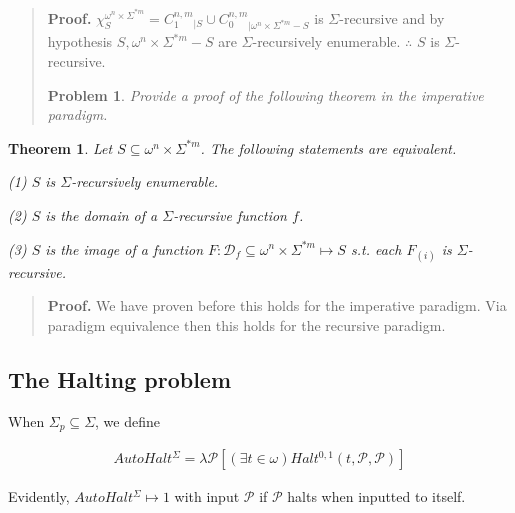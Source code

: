 \documentclass[a4paper, 12pt]{article}
\newtheorem{problem}{Problem}
\newtheorem{theorem}{Theorem}
\newtheorem{problem}{Problem}
\newtheorem{theorem}{Theorem}
\begin{document}
\small
\begin{quote}

    \textbf{Proof.} $\chi_{S}^{\omega^{n} \times \Sigma^{*m}} = C_1^{n ,m}_{|S}
    \cup C_0^{n, m}_{| \omega^{n} \times \Sigma^{*m} - S}$ is
    $\Sigma$-recursive and by hypothesis $S, \omega^{n} \times \Sigma^{*m} -S$
    are $\Sigma$-recursively enumerable. $\therefore $ $S$ is
    $\Sigma$-recursive.

    \begin{problem}
    Provide a proof of the following theorem in the imperative paradigm.
\end{problem}

\end{quote}
\normalsize

\begin{theorem}
    Let $S \subseteq \omega^{n} \times \Sigma^{*m} $. The following statements are equivalent. 

    \textit{(1)} $S$ is $\Sigma$-recursively enumerable. 

    \textit{(2)} $S$ is the domain of a $\Sigma$-recursive function
    $f$.  

    \textit{(3)} $S$ is the image of a function $F: \mathcal{D}_f \subseteq
    \omega^{n} \times \Sigma^{*m} \mapsto S$ s.t. each $F_{(i)}$ is
    $\Sigma$-recursive.
\end{theorem}


\small
\begin{quote}

\textbf{Proof.} We have proven before this holds for the imperative paradigm.
Via paradigm equivalence then this holds for the recursive paradigm.

\end{quote}
\normalsize

\subsection{The Halting problem}

When $\Sigma_p \subseteq \Sigma$, we define 

\begin{align*}
    AutoHalt^{\Sigma} = \lambda \mathcal{P} \left[ \left( \exists t \in \omega
    \right) Halt^{0, 1} (t, \mathcal{P}, \mathcal{P})   \right]
\end{align*}

Evidently, $AutoHalt^{\Sigma} \mapsto 1$ with input $\mathcal{P}$ if
$\mathcal{P}$ halts when inputted to itself.
\end{document}
